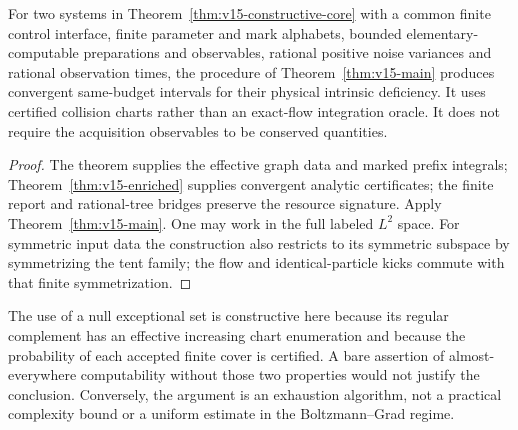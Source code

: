 \begin{corollary}
\label{cor:v15-constructive-physical}
For two systems in Theorem~\ref{thm:v15-constructive-core} with a common
finite control interface, finite parameter and mark alphabets, bounded
elementary-computable preparations and observables, rational positive
noise variances and rational observation times, the procedure of
Theorem~\ref{thm:v15-main} produces convergent same-budget intervals
for their physical intrinsic deficiency. It uses certified collision
charts rather than an exact-flow integration oracle. It does not
require the acquisition observables to be conserved quantities.
\end{corollary}
\begin{proof}
The theorem supplies the effective graph data and marked prefix
integrals; Theorem~\ref{thm:v15-enriched} supplies convergent analytic
certificates; the finite report and rational-tree bridges preserve the
resource signature. Apply Theorem~\ref{thm:v15-main}. One may work in the full labeled $L^2$ space. For symmetric input
data the construction also restricts to its symmetric subspace by
symmetrizing the tent family; the flow and identical-particle kicks
commute with that finite symmetrization.
\end{proof}

The use of a null exceptional set is constructive here because its
regular complement has an effective increasing chart enumeration and
because the probability of each accepted finite cover is certified.
A bare assertion of almost-everywhere computability without those two
properties would not justify the conclusion. Conversely, the argument
is an exhaustion algorithm, not a practical complexity bound or a
uniform estimate in the Boltzmann--Grad regime.
